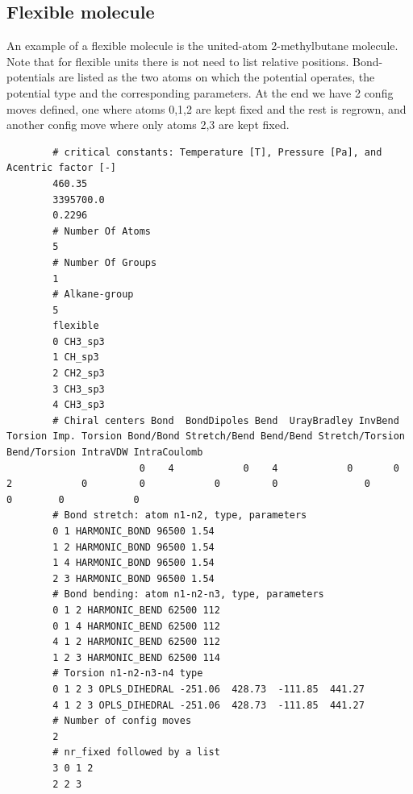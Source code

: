 \subsection{Flexible molecule}
An example of a flexible molecule is the united-atom 2-methylbutane molecule. Note that for flexible units there
is not need to list relative positions. Bond-potentials are listed as the two atoms on which the potential operates,
the potential type and the corresponding parameters. At the end we have 2 config moves defined, one where atoms 0,1,2
are kept fixed and the rest is regrown, and another config move where only atoms 2,3 are kept fixed.
\begin{tiny}
\begin{verbatim}
        # critical constants: Temperature [T], Pressure [Pa], and Acentric factor [-]
        460.35
        3395700.0
        0.2296
        # Number Of Atoms
        5
        # Number Of Groups
        1
        # Alkane-group
        5
        flexible
        0 CH3_sp3
        1 CH_sp3
        2 CH2_sp3
        3 CH3_sp3
        4 CH3_sp3
        # Chiral centers Bond  BondDipoles Bend  UrayBradley InvBend  Torsion Imp. Torsion Bond/Bond Stretch/Bend Bend/Bend Stretch/Torsion Bend/Torsion IntraVDW IntraCoulomb
                       0    4            0    4            0       0        2            0         0            0         0               0            0        0            0
        # Bond stretch: atom n1-n2, type, parameters
        0 1 HARMONIC_BOND 96500 1.54
        1 2 HARMONIC_BOND 96500 1.54
        1 4 HARMONIC_BOND 96500 1.54
        2 3 HARMONIC_BOND 96500 1.54
        # Bond bending: atom n1-n2-n3, type, parameters
        0 1 2 HARMONIC_BEND 62500 112
        0 1 4 HARMONIC_BEND 62500 112
        4 1 2 HARMONIC_BEND 62500 112
        1 2 3 HARMONIC_BEND 62500 114
        # Torsion n1-n2-n3-n4 type
        0 1 2 3 OPLS_DIHEDRAL -251.06  428.73  -111.85  441.27
        4 1 2 3 OPLS_DIHEDRAL -251.06  428.73  -111.85  441.27
        # Number of config moves
        2
        # nr_fixed followed by a list
        3 0 1 2
        2 2 3
\end{verbatim}
\end{tiny}

